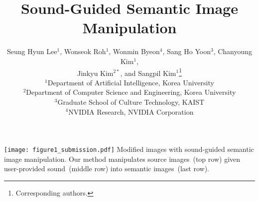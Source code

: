 \documentclass[10pt,twocolumn,letterpaper]{article}
\begin{document}
\title{Sound-Guided Semantic Image Manipulation}

 \author{
Seung Hyun Lee$^1$, Wonseok Roh$^1$, 
Wonmin Byeon$^4$, 
Sang Ho Yoon$^{3}$,
Chanyoung Kim$^1$,\\
  Jinkyu Kim$^{2*}$, and Sangpil Kim$^{1}$\thanks{Corresponding authors.}\\
  $^1$Department of Artificial Intelligence, Korea University\\
  $^2$Department of Computer Science and Engineering, Korea University\\
  $^3$Graduate School of Culture Technology, KAIST\\
  $^4$NVIDIA Research, NVIDIA Corporation\\
}

\maketitle

\begin{strip}\centering
\vspace{-1.59cm}
\texttt{[image: figure1\_submission.pdf]}
{
Modified images with sound-guided semantic image manipulation.
Our method manipulates source images~(top row) given user-provided sound~(middle row) into semantic images~(last row).
}\label{fig:fig1}\vspace{-0.5em}
\end{strip}
\end{document}

